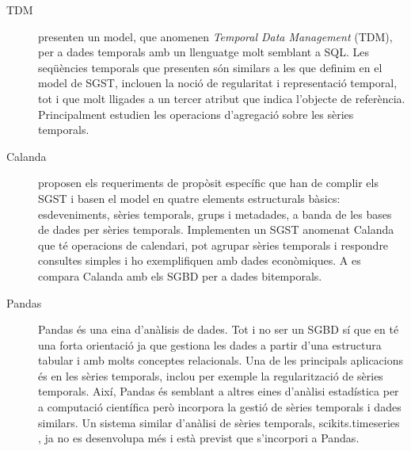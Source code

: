 \begin{description}


\item[TDM] \textcite{segev87:sigmod} presenten un model, que anomenen
  \emph{Temporal Data Management} (TDM), per a dades temporals amb un
  llenguatge molt semblant a \gls{SQL}. Les seqüències temporals que
  presenten són similars a les que definim en el model de
  \gls{SGST}, inclouen la noció de regularitat i representació
  temporal, tot i que molt lligades a un tercer atribut que indica
  l'objecte de referència. Principalment estudien les operacions
  d'agregació sobre les sèries temporals.


\item[Calanda] \textcite{dreyer94} proposen els requeriments de
  propòsit específic que han de complir els \gls{SGST} i basen el
  model en quatre elements estructurals bàsics: esdeveniments, sèries
  temporals, grups i metadades, a banda de les bases de dades per
  sèries temporals. Implementen un \gls{SGST} anomenat
  Calanda \parencite{dreyer94b,dreyer95,dreyer95b} que té operacions
  de calendari, pot agrupar sèries temporals i respondre consultes
  simples i ho exemplifiquen amb dades econòmiques. A \cite{schmidt95}
  es compara Calanda amb els \gls{SGBD} per a dades bitemporals.




\item[Pandas] Pandas \parencite{pandas} és una eina d'anàlisis de
  dades. Tot i no ser un \gls{SGBD} sí que en té una forta orientació
  ja que gestiona les dades a partir d'una estructura tabular i amb
  molts conceptes relacionals.  Una de les principals aplicacions és
  en les sèries temporals, inclou per exemple la regularització de
  sèries temporals. Així, Pandas és semblant a altres eines d'anàlisi
  estadística per a computació científica però incorpora la gestió de
  sèries temporals i dades similars. Un sistema similar d'anàlisi de
  sèries temporals, scikits.timeseries \parencite{pytseries}, ja no es
  desenvolupa més i està previst que s'incorpori a Pandas.



\end{description}







